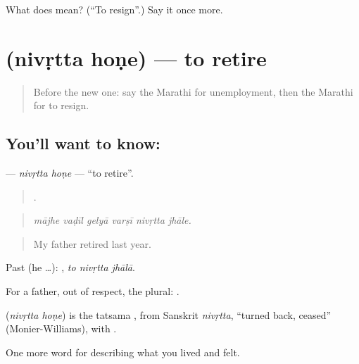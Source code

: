 \begin{tcolorbox}[breakable,colback=teal!4,colframe=teal!35!black,title={Before you move on}]
What does   mean? (\textquotedblleft{}To resign\textquotedblright{}.) Say it once more.
\end{tcolorbox}
\section[\texorpdfstring{\mr{निवृत्त} \mr{होणे} (nivṛtta hoṇe)}{निवृत्त होणे (nivṛtta hoṇe)}]{  (nivṛtta hoṇe) — to retire}

\label{lesson:MR-C510-nivrtta-hone}



\begin{quote}
Before the new one: say the Marathi for unemployment, then the Marathi for to resign.
\end{quote}

\subsection*{You'll want to know:  }
\textbf{ } — \emph{nivṛtta hoṇe} — \textquotedblleft{}to retire\textquotedblright{}.

\begin{quote}
     .
\end{quote}

\begin{quote}
\emph{mājhe vaḍīl gelyā varṣī nivṛtta jhāle.}
\end{quote}

\begin{quote}
My father retired last year.
\end{quote}

Past (he …):   , \emph{to nivṛtta jhālā}.

For a father, out of respect, the plural:   .

\begin{cousinweb}
\textbf{ } (\emph{nivṛtta hoṇe}) is the tatsama , from Sanskrit \emph{nivṛtta}, \textquotedblleft{}turned back, ceased\textquotedblright{} (Monier-Williams), with .
\end{cousinweb}

\begin{grammarlens}[title={What you've built}]
One more word for describing what you lived and felt.
\end{grammarlens}

